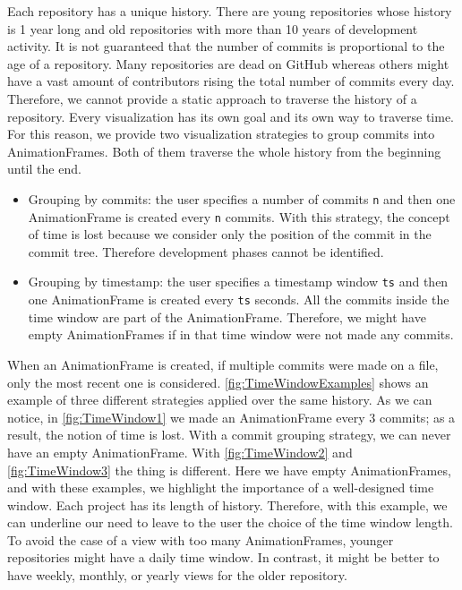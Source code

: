 Each repository has a unique history. There are young repositories whose history is 1 year long and old repositories with more than 10 years of development activity. It is not guaranteed that the number of commits is proportional to the age of a repository. Many repositories are dead on GitHub whereas others might have a vast amount of contributors rising the total number of commits every day. Therefore, we cannot provide a static approach to traverse the history of a repository. 
Every visualization has its own goal and its own way to traverse time. For this reason, we provide two visualization strategies to group commits into AnimationFrames. Both of them traverse the whole history from the beginning until the end.
\begin{itemize}
    \item{Grouping by commits}: the user specifies a number of commits \texttt{n} and then one AnimationFrame is created every \texttt{n} commits. With this strategy, the concept of time is lost because we consider only the position of the commit in the commit tree. Therefore development phases cannot be identified. 
    \item{Grouping by timestamp}: the user specifies a timestamp window \texttt{ts} and then one AnimationFrame is created every \texttt{ts} seconds. All the commits inside the time window are part of the AnimationFrame. Therefore, we might have empty AnimationFrames if in that time window were not made any commits. 
\end{itemize}

When an AnimationFrame is created, if multiple commits were made on a file, only the most recent one is considered. 
\autoref{fig:TimeWindowExamples} shows an example of three different strategies applied over the same history. As we can notice, in \autoref{fig:TimeWindow1} we made an AnimationFrame every 3 commits; as a result, the notion of time is lost. With a commit grouping strategy, we can never have an empty AnimationFrame. With  \autoref{fig:TimeWindow2} and \autoref{fig:TimeWindow3} the thing is different. Here we have empty AnimationFrames, and with these examples, we highlight the importance of a well-designed time window. Each project has its length of history. Therefore, with this example, we can underline our need to leave to the user the choice of the time window length. To avoid the case of a view with too many AnimationFrames, younger repositories might have a daily time window. In contrast, it might be better to have weekly, monthly, or yearly views for the older repository. 

